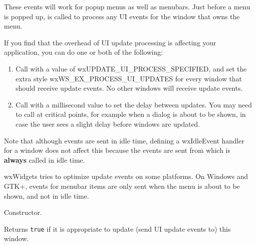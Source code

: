 These events will work for popup menus as well as menubars. Just before a menu is popped
up,  is called to process any UI events for
the window that owns the menu.

If you find that the overhead of UI update processing is affecting
your application, you can do one or both of the following:

\begin{enumerate}
\item Call  with
a value of wxUPDATE\_UI\_PROCESS\_SPECIFIED, and set the extra style
wxWS\_EX\_PROCESS\_UI\_UPDATES for every window that should receive update events.
No other windows will receive update events.
\item Call  with
a millisecond value to set the delay between updates. You may need
to call  at critical
points, for example when a dialog is about to be shown, in case the user
sees a slight delay before windows are updated.
\end{enumerate}

Note that although events are sent in idle time, defining a wxIdleEvent
handler for a window does not affect this because the events are sent from  
which is {\bf always} called in idle time.

wxWidgets tries to optimize update events on some platforms. On Windows
and GTK+, events for menubar items are only sent when the menu is about
to be shown, and not in idle time.




\label{wxupdateuieventctor}


Constructor.

\label{wxupdateuieventcanupdate}


Returns {\tt true} if it is appropriate to update (send UI update events to)
this window.

